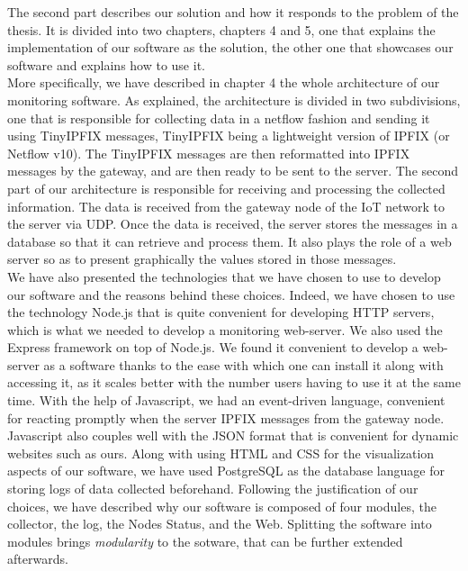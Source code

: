 The second part describes our solution and how it responds to the problem of the thesis. It is divided into two chapters, chapters 4 and 5, one that explains the implementation of our software as the solution, the other one that showcases our software and explains how to use it.\\

More specifically, we have described in chapter 4 the whole architecture of our monitoring software. As explained, the architecture is divided in two subdivisions, one that is responsible for collecting data in a netflow fashion and sending it using TinyIPFIX messages, TinyIPFIX being a lightweight version of IPFIX (or Netflow v10). The TinyIPFIX messages are then reformatted into IPFIX messages by the gateway, and are then ready to be sent to the server. The second part of our architecture is responsible for receiving and processing the collected information. The data is received from the gateway node of the IoT network to the server via UDP. Once the data is received, the server stores the messages in a database so that it can retrieve and process them. It also plays the role of a web server so as to present graphically the values stored in those messages. \\

We have also presented the technologies that we have chosen to use to develop our software and the reasons behind these choices. Indeed, we have chosen to use the technology Node.js that is quite convenient for developing HTTP servers, which is what we needed to develop a monitoring web-server. We also used the Express framework on top of Node.js. We found it convenient to develop a web-server as a software thanks to the ease with which one can install it along with accessing it, as it scales better with the number users having to use it at the same time. With the help of Javascript, we had an event-driven language, convenient for reacting promptly when the server IPFIX messages from the gateway node. Javascript also couples well with the JSON format that is convenient for dynamic websites such as ours. Along with using HTML and CSS for the visualization aspects of our software, we have used PostgreSQL as the database language for storing logs of data collected beforehand. Following the justification of our choices, we have described why our software is composed of four modules, the collector, the log, the Nodes Status, and the Web. Splitting the software into modules brings \textit{modularity} to the sotware, that can be further extended afterwards.\\

